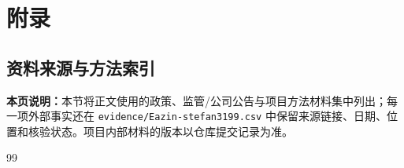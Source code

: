 \clearpage
\section{附录}
\subsection*{资料来源与方法索引}\label{page:49}
\fi
\textbf{本页说明：}本节将正文使用的政策、监管/公司公告与项目方法材料集中列出；每一项外部事实还在 \texttt{evidence/Eazin-stefan3199.csv} 中保留来源链接、日期、位置和核验状态。项目内部材料的版本以仓库提交记录为准。
\renewcommand{\refname}{参考文献}
\begin{thebibliography}{99}


\end{thebibliography}

